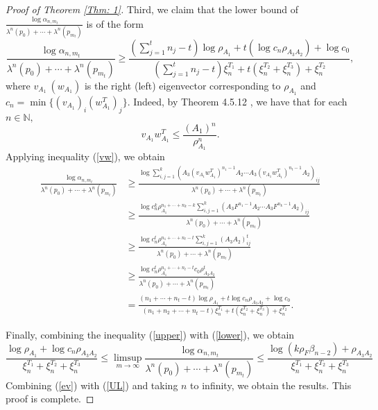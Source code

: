 \documentclass{amsart}
\theoremstyle{definition}
\begin{document}
\begin{proof}[Proof of Theorem \ref{Thm: 1}]
 Third, we claim that the lower bound of $\frac{\log \alpha_{n,m_t}}{\lambda^n(p_0)+\cdots +\lambda^n(p_{m_t})}$ is of the form
\begin{equation}
    \frac{\log \alpha_{n,m_t}}{\lambda^n(p_0)+\cdots +\lambda^n(p_{m_t})}\geq \frac{\left(\sum_{j=1}^tn_j-t\right)\log \rho_{A_1}+t(\log c_n\rho_{A_3A_2})+\log c_0}{\left(\sum_{j=1}^tn_j-t\right)\xi_n^{T_1}+t(\xi_n^{T_2}+\xi_n^{T_3})+\xi_n^{T_2}},
\label{lower}
\end{equation}
where $v_{A_1}~(w_{A_1})$ is the right (left) eigenvector corresponding to $\rho_{A_1}$ and $c_n=\min\{(v_{A_1})_i(w_{A_1}^T)_j\}.$ Indeed, by Theorem 4.5.12 \cite{LM-1995}, we have that for each $n\in\mathbb{N},$
\begin{equation}\label{vw}
v_{A_1}w_{A_1}^T\leq \frac{(A_1)^n}{\rho_{A_1}^n}.
\end{equation}
Applying inequality (\ref{vw}), we obtain
\begin{align*}
\frac{\log \alpha_{n,m_t}}{\lambda^n(p_0)+\cdots +\lambda^n(p_{m_t})}&\geq \frac{\log \sum_{i,j=1}^k(A_3(v_{A_1}w_{A_1}^T)^{n_1-1}A_2\cdots A_3(v_{A_1}w_{A_1}^T)^{n_t-1}A_2)_{ij}}{\lambda^n(p_0)+\cdots +\lambda^n(p_{m_t})}\\
&\geq \frac{\log c_n^k\rho_{A_1}^{n_1+\cdots +n_k-k}\sum_{i,j=1}^k(A_3F^{n_1-1}A_2\cdots A_3F^{n_k-1}A_2)_{ij}}{\lambda^n(p_0)+\cdots +\lambda^n(p_{m_t})}\\
&\geq  \frac{\log c_n^t\rho_{A_1}^{n_1+\cdots +n_t-t}\sum_{i,j=1}^{k}(A_3A_2)^t_{ij}}{\lambda^n(p_0)+\cdots +\lambda^n(p_{m_t})}\\
&\geq  \frac{\log c_n^t\rho_{A_1}^{n_1+\cdots +n_t-t}c_0\rho_{A_3A_2}^t}{\lambda^n(p_0)+\cdots +\lambda^n(p_{m_t})}\\
&=  \frac{(n_1+\cdots +n_t-t)\log \rho_{A_1}+t\log c_n\rho_{A_3A_2}+\log c_0}{(n_1+n_2+\cdots +n_t-t)\xi_n^{T_1}+t(\xi_n^{T_2}+\xi_n^{T_3})+\xi_n^{T_2}}.
\end{align*}

 Finally, combining the inequality (\ref{upper}) with (\ref{lower}), we obtain 
\begin{equation}\label{UL}
  \frac{\log\rho_{A_1}+\log c_n\rho_{A_3A_2}}{\xi_n^{T_1}+\xi_n^{T_2}+\xi_n^{T_3}}\leq \limsup_{m\rightarrow\infty} \frac{\log \alpha_{n,m_t}}{\lambda^n(p_0)+\cdots +\lambda^n(p_{m_t})}\leq \frac{\log(k\rho_F\beta_{n-2})+\rho_{A_3A_2}}{\xi_n^{T_1}+\xi_n^{T_2}+\xi_n^{T_3}}
\end{equation}
Combining (\ref{ev}) with (\ref{UL}) and taking $n$ to infinity, we obtain the results. This proof is complete.
\end{proof}
\end{document}
